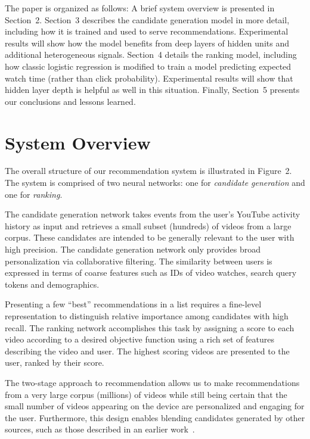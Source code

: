 The paper is organized as follows: A brief system overview is presented in
Section~2. Section~3 describes the candidate generation model in more detail,
including how it is trained and used to serve recommendations. Experimental
results will show how the model benefits from deep layers of hidden units and
additional heterogeneous signals. Section~4 details the ranking model,
including how classic logistic regression is modified to train a model
predicting expected watch time (rather than click probability). Experimental
results will show that hidden layer depth is helpful as well in this
situation. Finally, Section~5 presents our conclusions and lessons learned.

\section{System Overview}

The overall structure of our recommendation system is illustrated in
Figure~2. The system is comprised of two neural networks: one for
\textit{candidate generation} and one for \textit{ranking}.

The candidate generation network takes events from the user's YouTube
activity history as input and retrieves a small subset (hundreds) of videos
from a large corpus. These candidates are intended to be generally relevant
to the user with high precision. The candidate generation network only
provides broad personalization via collaborative filtering. The similarity
between users is expressed in terms of coarse features such as IDs of video
watches, search query tokens and demographics.

Presenting a few ``best'' recommendations in a list requires a fine-level
representation to distinguish relative importance among candidates with high
recall. The ranking network accomplishes this task by assigning a score to
each video according to a desired objective function using a rich set of
features describing the video and user. The highest scoring videos are
presented to the user, ranked by their score.

The two-stage approach to recommendation allows us to make recommendations
from a very large corpus (millions) of videos while still being certain that
the small number of videos appearing on the device are personalized and
engaging for the user. Furthermore, this design enables blending candidates
generated by other sources, such as those described in an earlier
work~\cite{davidson2010youtube}.

